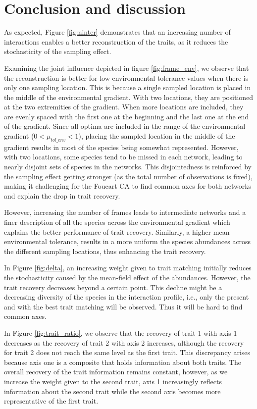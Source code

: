\section{Conclusion and discussion}

As expected, Figure \ref{fig:ninter} demonstrates that an increasing number of interactions enables a better reconstruction of the traits, as it reduces the stochasticity of the sampling effect.


Examining the joint influence depicted in figure \ref{fig:frame_env}, we observe that the reconstruction is better for low environmental tolerance values when there is only one sampling location. This is because a single sampled location is placed in the middle of the environmental gradient. With two locations, they are positioned at the two extremities of the gradient. When more locations are included, they are evenly spaced with the first one at the beginning and the last one at the end of the gradient. 
Since all optima are included in the range of the environmental gradient ($0<\mu_{tol\_env}<1$), placing the sampled location in the middle of the gradient results in most of the species being somewhat represented. However, with two locations, some species tend to be missed in each network, leading to nearly disjoint sets of species in the networks. This disjointedness is reinforced by the sampling effect getting stronger (as the total number of observations is fixed), making it challenging for the Foucart CA to find common axes for both networks and explain the drop in trait recovery.

However, increasing the number of frames leads to intermediate networks and a finer description of all the species across the environmental gradient which explains the better performance of trait recovery. Similarly, a higher mean environmental tolerance, results in a more uniform the species abundances across the different sampling locations, thus enhancing the trait recovery.


In Figure \ref{fig:delta}, an increasing weight given to trait matching initially reduces the stochasticity caused by the mean-field effect of the abundances. However, the trait recovery decreases beyond a certain point. This decline might be a decreasing diversity of the species in the interaction profile, i.e., only the present and with the best trait matching will be observed. Thus it will be hard to find common axes.


In Figure \ref{fig:trait_ratio}, we observe that the recovery of trait 1 with axis 1 decreases as the recovery of trait 2 with axis 2 increases, although the recovery for trait 2 does not reach the same level as the first trait. This discrepancy arises because axis one is a composite that holds information about both traits. The overall recovery of the trait information remains constant, however, as we increase the weight given to the second trait, axis 1 increasingly reflects information about the second trait while the second axis becomes more representative of the first trait.



